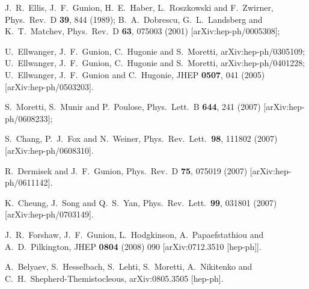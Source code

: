 \documentclass[aps,12pt,superscriptaddress,nofootinbib,floatfix,showpacs]{revtex4}
\begin{document}
\begin{thebibliography}{99}
 J.~R.~Ellis, J.~F.~Gunion, H.~E.~Haber, L.~Roszkowski and F.~Zwirner,
  Phys.\ Rev.\  D {\bf 39}, 844 (1989);
  B.~A.~Dobrescu, G.~L.~Landsberg and K.~T.~Matchev,
  Phys.\ Rev.\  D {\bf 63}, 075003 (2001)
  [arXiv:hep-ph/0005308];
  
    U.~Ellwanger, J.~F.~Gunion, C.~Hugonie and S.~Moretti,
  arXiv:hep-ph/0305109;
  U.~Ellwanger, J.~F.~Gunion, C.~Hugonie and S.~Moretti,
  arXiv:hep-ph/0401228;
    U.~Ellwanger, J.~F.~Gunion and C.~Hugonie,
  JHEP {\bf 0507}, 041 (2005)
  [arXiv:hep-ph/0503203].
  
 
  
  S.~Moretti, S.~Munir and P.~Poulose,
  Phys.\ Lett.\  B {\bf 644}, 241 (2007)
  [arXiv:hep-ph/0608233];
  
  
  
 S.~Chang, P.~J.~Fox and N.~Weiner,
  Phys.\ Rev.\ Lett.\  {\bf 98}, 111802 (2007)
  [arXiv:hep-ph/0608310]. 
  
  R.~Dermisek and J.~F.~Gunion,
  Phys.\ Rev.\  D {\bf 75}, 075019 (2007)
  [arXiv:hep-ph/0611142].  
  
 K.~Cheung, J.~Song and Q.~S.~Yan,
  Phys.\ Rev.\ Lett.\  {\bf 99}, 031801 (2007)
  [arXiv:hep-ph/0703149]. 

  J.~R.~Forshaw, J.~F.~Gunion, L.~Hodgkinson, A.~Papaefstathiou and A.~D.~Pilkington,
  JHEP {\bf 0804} (2008) 090
  [arXiv:0712.3510 [hep-ph]].  
  
  A.~Belyaev, S.~Hesselbach, S.~Lehti, S.~Moretti, 
  A.~Nikitenko and C.~H.~Shepherd-Themistocleous,
  arXiv:0805.3505 [hep-ph]. 
  

\end{thebibliography}
\end{document}
